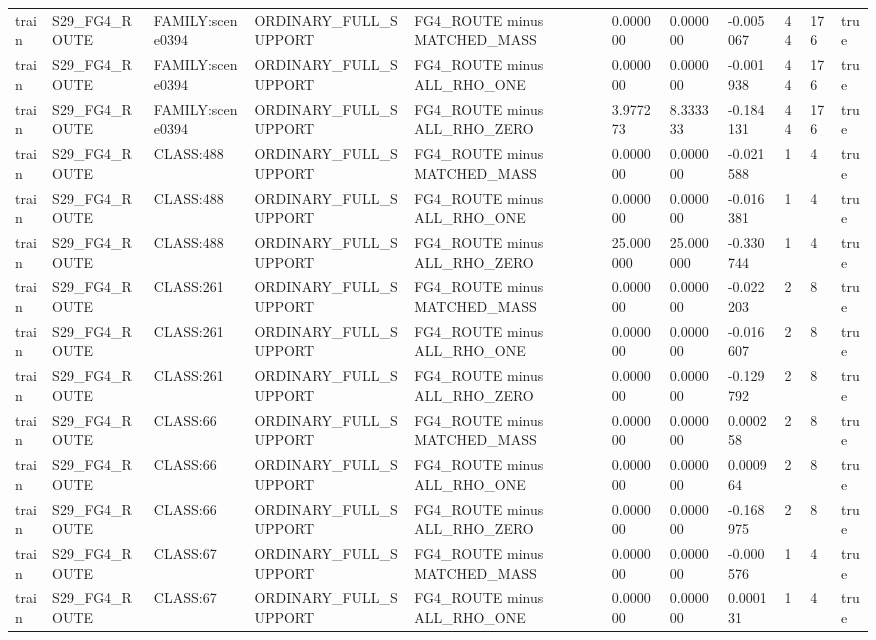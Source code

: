 \begin{tabular}{lllllllllll}
train & S29\_FG4\_ROUTE & FAMILY:scene0394 & ORDINARY\_FULL\_SUPPORT & FG4\_ROUTE minus MATCHED\_MASS & 0.000000 & 0.000000 & -0.005067 & 44 & 176 & true \\
train & S29\_FG4\_ROUTE & FAMILY:scene0394 & ORDINARY\_FULL\_SUPPORT & FG4\_ROUTE minus ALL\_RHO\_ONE & 0.000000 & 0.000000 & -0.001938 & 44 & 176 & true \\
train & S29\_FG4\_ROUTE & FAMILY:scene0394 & ORDINARY\_FULL\_SUPPORT & FG4\_ROUTE minus ALL\_RHO\_ZERO & 3.977273 & 8.333333 & -0.184131 & 44 & 176 & true \\
train & S29\_FG4\_ROUTE & CLASS:488 & ORDINARY\_FULL\_SUPPORT & FG4\_ROUTE minus MATCHED\_MASS & 0.000000 & 0.000000 & -0.021588 & 1 & 4 & true \\
train & S29\_FG4\_ROUTE & CLASS:488 & ORDINARY\_FULL\_SUPPORT & FG4\_ROUTE minus ALL\_RHO\_ONE & 0.000000 & 0.000000 & -0.016381 & 1 & 4 & true \\
train & S29\_FG4\_ROUTE & CLASS:488 & ORDINARY\_FULL\_SUPPORT & FG4\_ROUTE minus ALL\_RHO\_ZERO & 25.000000 & 25.000000 & -0.330744 & 1 & 4 & true \\
train & S29\_FG4\_ROUTE & CLASS:261 & ORDINARY\_FULL\_SUPPORT & FG4\_ROUTE minus MATCHED\_MASS & 0.000000 & 0.000000 & -0.022203 & 2 & 8 & true \\
train & S29\_FG4\_ROUTE & CLASS:261 & ORDINARY\_FULL\_SUPPORT & FG4\_ROUTE minus ALL\_RHO\_ONE & 0.000000 & 0.000000 & -0.016607 & 2 & 8 & true \\
train & S29\_FG4\_ROUTE & CLASS:261 & ORDINARY\_FULL\_SUPPORT & FG4\_ROUTE minus ALL\_RHO\_ZERO & 0.000000 & 0.000000 & -0.129792 & 2 & 8 & true \\
train & S29\_FG4\_ROUTE & CLASS:66 & ORDINARY\_FULL\_SUPPORT & FG4\_ROUTE minus MATCHED\_MASS & 0.000000 & 0.000000 & 0.000258 & 2 & 8 & true \\
train & S29\_FG4\_ROUTE & CLASS:66 & ORDINARY\_FULL\_SUPPORT & FG4\_ROUTE minus ALL\_RHO\_ONE & 0.000000 & 0.000000 & 0.000964 & 2 & 8 & true \\
train & S29\_FG4\_ROUTE & CLASS:66 & ORDINARY\_FULL\_SUPPORT & FG4\_ROUTE minus ALL\_RHO\_ZERO & 0.000000 & 0.000000 & -0.168975 & 2 & 8 & true \\
train & S29\_FG4\_ROUTE & CLASS:67 & ORDINARY\_FULL\_SUPPORT & FG4\_ROUTE minus MATCHED\_MASS & 0.000000 & 0.000000 & -0.000576 & 1 & 4 & true \\
train & S29\_FG4\_ROUTE & CLASS:67 & ORDINARY\_FULL\_SUPPORT & FG4\_ROUTE minus ALL\_RHO\_ONE & 0.000000 & 0.000000 & 0.000131 & 1 & 4 & true \\

\end{tabular}

